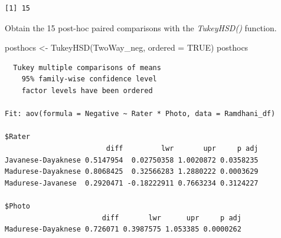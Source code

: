 \documentclass[
  11pt,
]{book}
\newenvironment{Shaded}{\begin{snugshade}}{\end{snugshade}}
\newcommand{\AttributeTok}[1]{\textcolor[rgb]{0.77,0.63,0.00}{#1}}
\newcommand{\ConstantTok}[1]{\textcolor[rgb]{0.00,0.00,0.00}{#1}}
\newcommand{\FunctionTok}[1]{\textcolor[rgb]{0.00,0.00,0.00}{#1}}
\newcommand{\NormalTok}[1]{#1}
\newcommand{\OtherTok}[1]{\textcolor[rgb]{0.56,0.35,0.01}{#1}}
\begin{document}
\begin{verbatim}
[1] 15
\end{verbatim}

Obtain the 15 post-hoc paired comparisons with the \emph{TukeyHSD()} function.

\begin{Shaded}
\begin{Highlighting}[]
\NormalTok{posthocs }\OtherTok{\textless{}{-}} \FunctionTok{TukeyHSD}\NormalTok{(TwoWay\_neg, }\AttributeTok{ordered =} \ConstantTok{TRUE}\NormalTok{)}
\NormalTok{posthocs}
\end{Highlighting}
\end{Shaded}

\begin{verbatim}
  Tukey multiple comparisons of means
    95% family-wise confidence level
    factor levels have been ordered

Fit: aov(formula = Negative ~ Rater * Photo, data = Ramdhani_df)

$Rater
                        diff         lwr       upr     p adj
Javanese-Dayaknese 0.5147954  0.02750358 1.0020872 0.0358235
Madurese-Dayaknese 0.8068425  0.32566283 1.2880222 0.0003629
Madurese-Javanese  0.2920471 -0.18222911 0.7663234 0.3124227

$Photo
                       diff       lwr      upr     p adj
Madurese-Dayaknese 0.726071 0.3987575 1.053385 0.0000262


\end{verbatim}
\end{document}
